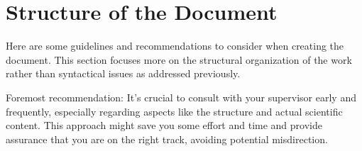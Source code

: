 \chapter{Structure of the Document}
\label{chap:structure}
Here are some guidelines and recommendations to consider when creating the document. This section focuses more on the structural organization of the work rather than syntactical issues as addressed previously.

Foremost recommendation: It's crucial to consult with your supervisor early and frequently, especially regarding aspects like the structure and actual scientific content. This approach might save you some effort and time and provide assurance that you are on the right track, avoiding potential misdirection.

